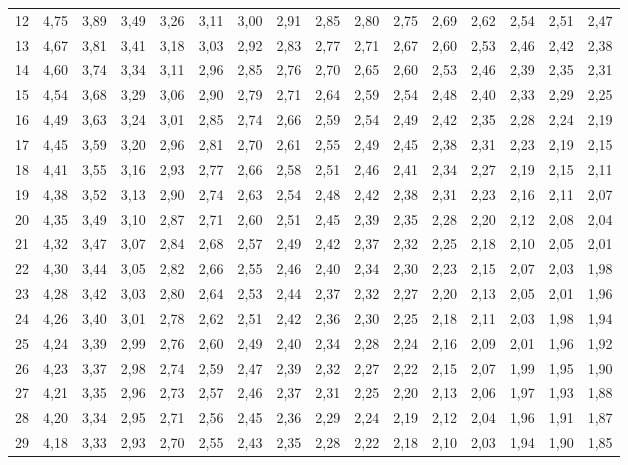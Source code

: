 \documentclass[a4paper,10pt]{extarticle}
\begin{document}
\begin{center}
\begin{tabular}{r|rrrrrrrrrrrrrrr}
12 & 4,75 & 3,89 & 3,49 & 3,26 & 3,11 & 3,00 & 2,91 & 2,85 & 2,80 & 2,75 & 2,69 & 2,62 & 2,54 & 2,51 & 2,47\\
13 & 4,67 & 3,81 & 3,41 & 3,18 & 3,03 & 2,92 & 2,83 & 2,77 & 2,71 & 2,67 & 2,60 & 2,53 & 2,46 & 2,42 & 2,38\\
14 & 4,60 & 3,74 & 3,34 & 3,11 & 2,96 & 2,85 & 2,76 & 2,70 & 2,65 & 2,60 & 2,53 & 2,46 & 2,39 & 2,35 & 2,31\\
15 & 4,54 & 3,68 & 3,29 & 3,06 & 2,90 & 2,79 & 2,71 & 2,64 & 2,59 & 2,54 & 2,48 & 2,40 & 2,33 & 2,29 & 2,25\\
16 & 4,49 & 3,63 & 3,24 & 3,01 & 2,85 & 2,74 & 2,66 & 2,59 & 2,54 & 2,49 & 2,42 & 2,35 & 2,28 & 2,24 & 2,19\\
17 & 4,45 & 3,59 & 3,20 & 2,96 & 2,81 & 2,70 & 2,61 & 2,55 & 2,49 & 2,45 & 2,38 & 2,31 & 2,23 & 2,19 & 2,15\\
18 & 4,41 & 3,55 & 3,16 & 2,93 & 2,77 & 2,66 & 2,58 & 2,51 & 2,46 & 2,41 & 2,34 & 2,27 & 2,19 & 2,15 & 2,11\\
19 & 4,38 & 3,52 & 3,13 & 2,90 & 2,74 & 2,63 & 2,54 & 2,48 & 2,42 & 2,38 & 2,31 & 2,23 & 2,16 & 2,11 & 2,07\\
20 & 4,35 & 3,49 & 3,10 & 2,87 & 2,71 & 2,60 & 2,51 & 2,45 & 2,39 & 2,35 & 2,28 & 2,20 & 2,12 & 2,08 & 2,04\\
21 & 4,32 & 3,47 & 3,07 & 2,84 & 2,68 & 2,57 & 2,49 & 2,42 & 2,37 & 2,32 & 2,25 & 2,18 & 2,10 & 2,05 & 2,01\\
22 & 4,30 & 3,44 & 3,05 & 2,82 & 2,66 & 2,55 & 2,46 & 2,40 & 2,34 & 2,30 & 2,23 & 2,15 & 2,07 & 2,03 & 1,98\\
23 & 4,28 & 3,42 & 3,03 & 2,80 & 2,64 & 2,53 & 2,44 & 2,37 & 2,32 & 2,27 & 2,20 & 2,13 & 2,05 & 2,01 & 1,96\\
24 & 4,26 & 3,40 & 3,01 & 2,78 & 2,62 & 2,51 & 2,42 & 2,36 & 2,30 & 2,25 & 2,18 & 2,11 & 2,03 & 1,98 & 1,94\\
25 & 4,24 & 3,39 & 2,99 & 2,76 & 2,60 & 2,49 & 2,40 & 2,34 & 2,28 & 2,24 & 2,16 & 2,09 & 2,01 & 1,96 & 1,92\\
26 & 4,23 & 3,37 & 2,98 & 2,74 & 2,59 & 2,47 & 2,39 & 2,32 & 2,27 & 2,22 & 2,15 & 2,07 & 1,99 & 1,95 & 1,90\\
27 & 4,21 & 3,35 & 2,96 & 2,73 & 2,57 & 2,46 & 2,37 & 2,31 & 2,25 & 2,20 & 2,13 & 2,06 & 1,97 & 1,93 & 1,88\\
28 & 4,20 & 3,34 & 2,95 & 2,71 & 2,56 & 2,45 & 2,36 & 2,29 & 2,24 & 2,19 & 2,12 & 2,04 & 1,96 & 1,91 & 1,87\\
29 & 4,18 & 3,33 & 2,93 & 2,70 & 2,55 & 2,43 & 2,35 & 2,28 & 2,22 & 2,18 & 2,10 & 2,03 & 1,94 & 1,90 & 1,85\\

\end{tabular}
\end{center}
\end{document}
